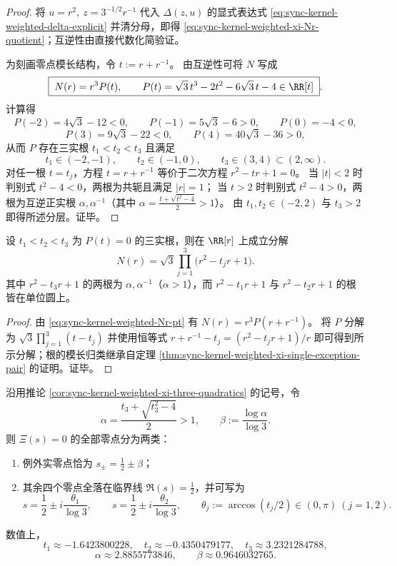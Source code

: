 \begin{proof}
将 \(u=r^2,\ z=3^{-1/2}r^{-1}\) 代入 \(\Delta(z,u)\) 的显式表达式 \eqref{eq:sync-kernel-weighted-delta-explicit} 并清分母，即得 \eqref{eq:sync-kernel-weighted-xi-Nr-quotient}；互逆性由直接代数化简验证。
\par
为刻画零点模长结构，令 \(t:=r+r^{-1}\)。
由互逆性可将 \(N\) 写成
\begin{equation}\label{eq:sync-kernel-weighted-Nr-pt}
\boxed{\;
N(r)=r^3P(t),
\qquad
P(t)=\sqrt3\,t^3-2t^2-6\sqrt3\,t-4\in\RR[t]\; }.
\end{equation}
计算得
\[
P(-2)=4\sqrt3-12<0,\qquad
P(-1)=5\sqrt3-6>0,\qquad
P(0)=-4<0,
\]
\[
P(3)=9\sqrt3-22<0,\qquad
P(4)=40\sqrt3-36>0,
\]
从而 \(P\) 存在三实根 \(t_1<t_2<t_3\) 且满足
\[
t_1\in(-2,-1),\qquad t_2\in(-1,0),\qquad t_3\in(3,4)\subset(2,\infty).
\]
对任一根 \(t=t_j\)，方程 \(t=r+r^{-1}\) 等价于二次方程 \(r^2-tr+1=0\)。
当 \(|t|<2\) 时判别式 \(t^2-4<0\)，两根为共轭且满足 \(|r|=1\)；
当 \(t>2\) 时判别式 \(t^2-4>0\)，两根为互逆正实根 \(\alpha,\alpha^{-1}\)（其中 \(\alpha=\frac{t+\sqrt{t^2-4}}{2}>1\)）。
由 \(t_1,t_2\in(-2,2)\) 与 \(t_3>2\) 即得所述分层。证毕。
\end{proof}

\begin{corollary}\label{cor:sync-kernel-weighted-xi-three-quadratics}
设 \(t_1<t_2<t_3\) 为 \(P(t)=0\) 的三实根，则在 \(\RR[r]\) 上成立分解
\[
N(r)=\sqrt3\prod_{j=1}^{3}\bigl(r^2-t_jr+1\bigr).
\]
其中 \(r^2-t_3r+1\) 的两根为 \(\alpha,\alpha^{-1}\)（\(\alpha>1\)），而 \(r^2-t_1r+1\) 与 \(r^2-t_2r+1\) 的根皆在单位圆上。
\end{corollary}

\begin{proof}
由 \eqref{eq:sync-kernel-weighted-Nr-pt} 有 \(N(r)=r^3P(r+r^{-1})\)。
将 \(P\) 分解为 \(\sqrt3\prod_{j=1}^{3}(t-t_j)\) 并使用恒等式
\(
r+r^{-1}-t_j=(r^2-t_jr+1)/r
\)
即可得到所示分解；根的模长归类继承自定理 \ref{thm:sync-kernel-weighted-xi-single-exception-pair} 的证明。证毕。
\end{proof}

\begin{theorem}[例外零点的显式坐标与偏离指数]\label{thm:sync-kernel-weighted-xi-exception-coordinate}
沿用推论 \ref{cor:sync-kernel-weighted-xi-three-quadratics} 的记号，令
\[
\alpha=\frac{t_3+\sqrt{t_3^2-4}}{2}>1,
\qquad
\beta:=\frac{\log\alpha}{\log 3}.
\]
则 \(\Xi(s)=0\) 的全部零点分为两类：
\begin{enumerate}
  \item 例外实零点恰为 \(s_\pm=\frac12\pm\beta\)；
  \item 其余四个零点全落在临界线 \(\Re(s)=\tfrac12\)，并可写为
  \[
  s=\frac12\pm i\frac{\theta_1}{\log 3},
  \qquad
  s=\frac12\pm i\frac{\theta_2}{\log 3},
  \qquad
  \theta_j:=\arccos(t_j/2)\in(0,\pi)\ (j=1,2).
  \]
\end{enumerate}
数值上，
\[
t_1\approx-1.6423800228,\quad t_2\approx-0.4350479177,\quad t_3\approx3.2321284788,
\]
\[
\alpha\approx 2.8855773846,\qquad \beta\approx 0.9646032765.
\]
\end{theorem}

